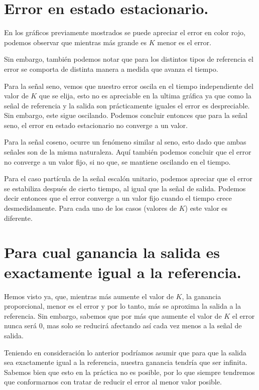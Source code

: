 \documentclass[11pt,a4paper]{article}
\begin{document}
\section{Error en estado estacionario.}

En los gráficos previamente mostrados se puede apreciar el error en color rojo, podemos observar que mientras más grande es $K$ menor es el error.

Sin embargo, también podemos notar que para los distintos tipos de referencia el error se comporta de distinta manera a medida que avanza el tiempo.

Para  la señal seno, vemos que nuestro error oscila en el tiempo independiente del valor de $K$ que se elija, esto no es apreciable en la ultima gráfica ya que como la señal de referencia y la salida son prácticamente iguales el error es despreciable. Sin embargo, este sigue oscilando. Podemos concluir entonces que para la señal seno, el error en estado estacionario no converge a un valor.

Para la señal coseno, ocurre un fenómeno similar al seno, esto dado que ambas señales son de la misma naturaleza. Aquí también podemos concluir que el error no converge a un valor fijo, si no que, se mantiene oscilando en el tiempo.

Para el caso partícula de la señal escalón unitario, podemos apreciar que el error se estabiliza después de cierto tiempo, al igual que la señal de salida. Podemos decir entonces que el error converge a un valor fijo cuando el tiempo crece desmedidamente. Para cada uno de los casos (valores de $K$) este valor es diferente.

\section{Para cual ganancia la salida es exactamente igual a la referencia.}

Hemos visto ya, que, mientras más aumente el valor de $K$, la ganancia proporcional, menor es el error y por lo tanto, más se aproxima la salida a la referencia. Sin embargo, sabemos que por más que aumente el valor de $K$ el error nunca será $0$, mas solo se reducirá afectando así cada vez menos a la señal de salida.

Teniendo en consideración lo anterior podríamos asumir que para que la salida sea exactamente igual a la referencia, nuestra ganancia tendría que ser infinita. Sabemos bien que esto en la práctica no es posible, por lo que siempre tendremos que conformarnos con tratar de reducir el error al menor valor posible.
\end{document}
